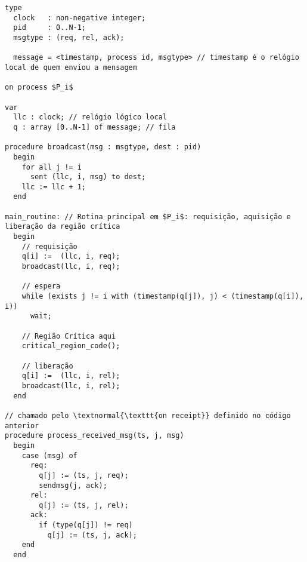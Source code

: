 \begin{lstlisting}[caption={Exclusão mútua no processo $P_i$}, emph={req,rel,ack}, emph={[2]i,j}, emphstyle={[2]\emph}, mathescape=true]
type
  clock   : non-negative integer;
  pid     : 0..N-1;
  msgtype : (req, rel, ack);

  message = <timestamp, process id, msgtype> // timestamp é o relógio local de quem enviou a mensagem

on process $P_i$

var
  llc : clock; // relógio lógico local
  q : array [0..N-1] of message; // fila

procedure broadcast(msg : msgtype, dest : pid)
  begin
    for all j != i
      sent (llc, i, msg) to dest;
    llc := llc + 1;
  end

main_routine: // Rotina principal em $P_i$: requisição, aquisição e liberação da região crítica
  begin
    // requisição
    q[i] :=  (llc, i, req);
    broadcast(llc, i, req);

    // espera
    while (exists j != i with (timestamp(q[j]), j) < (timestamp(q[i]), i))
      wait;

    // Região Crítica aqui
    critical_region_code();

    // liberação
    q[i] :=  (llc, i, rel);
    broadcast(llc, i, rel);
  end

// chamado pelo \textnormal{\texttt{on receipt}} definido no código anterior
procedure process_received_msg(ts, j, msg)
  begin
    case (msg) of
      req:
        q[j] := (ts, j, req);
        sendmsg(j, ack);
      rel:
        q[j] := (ts, j, rel);
      ack:
        if (type(q[j]) != req)
          q[j] := (ts, j, ack);
    end
  end
\end{lstlisting}
